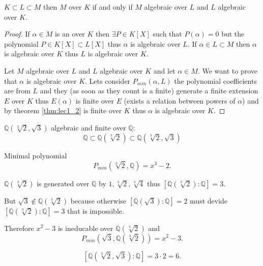 \begin{theorem}
  $K \subset L \subset M$ then $M$ 
  over $K$ if and only if $M$ algebraic over $L$ and $L$ algebraic
  over $K$. 
  \begin{proof}
    If $\alpha \in M$ is an  over $K$ then
    $\exists P \in K\left[X\right]$ such that
    $P\left(\alpha\right) = 0$ but the
    polynomial $P \in K\left[X\right] \subset L\left[X\right]$
    thus $\alpha$ is algebraic over $L$.
    If $\alpha \in L \subset M$ then $\alpha$ is algebraic over $K$
    thus $L$ is algebraic over $K$.

    Let $M$ algebraic over $L$ and $L$ algebraic over $K$ and let
    $\alpha \in M$. We want to prove that $\alpha$ is algebraic over
    $K$. Lets consider $P_{min}\left(\alpha, L\right)$ the polynomial
    coefficients are from $L$ and they (as soon as they count is a
    finite)  generate a finite extension $E$ over $K$ thus
    $E\left(\alpha\right)$ is finite over $E$ (exists a relation
    between powers of $\alpha$) and by theorem
    \ref{thm:lec1_2} is finite over $K$ thus $\alpha$ is algebraic
    over $K$.
  \end{proof}
\end{theorem}
\begin{example}
  $\mathbb{Q}\left( \sqrt[3]{2}, \sqrt{3}\right)$ algebraic and finite
  over $\mathbb{Q}$:
  \[
  \mathbb{Q} \subset \mathbb{Q}\left( \sqrt[3]{2}\right)
  \subset \mathbb{Q}\left( \sqrt[3]{2}, \sqrt{3}\right)
  \]

  Minimal polynomial
  \[
  P_{min}\left(\sqrt[3]{2}, \mathbb{Q}\right) = x^3 - 2.
  \]

  $\mathbb{Q}\left( \sqrt[3]{2}\right)$ is generated over $\mathbb{Q}$
  by $1, \sqrt[3]{2}, \sqrt[3]{4}$ thus
  $\left[\mathbb{Q}\left( \sqrt[3]{2}\right): \mathbb{Q}\right] = 3$.

  But $\sqrt{3} \notin \mathbb{Q}\left( \sqrt[3]{2}\right)$ because
  otherwise $\left[\mathbb{Q}\left( \sqrt{3}\right): \mathbb{Q}\right]
  = 2$ must devide  
  $\left[\mathbb{Q}\left( \sqrt[3]{2}\right): \mathbb{Q}\right] = 3$
  that is impossible.

  Therefore $x^2 - 3$ is ineducable over
  $\mathbb{Q}\left( \sqrt[3]{2}\right)$ and
  \[
  P_{min}\left(\sqrt{3}, \mathbb{Q}\left( \sqrt[3]{2}\right)\right) =
  x^2 - 3.
  \]

  \[
  \left[\mathbb{Q}\left( \sqrt[3]{2}, \sqrt{3}\right):
    \mathbb{Q}\right] = 3 \cdot 2 = 6.
  \]
\end{example}


